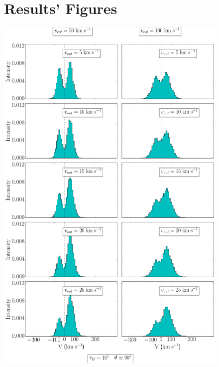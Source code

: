 \documentclass[twocolappendix]{latex/emulateapj}
\begin{document}




\newpage

\appendix

\begin{figure}[!htbp]
	\centering
	\begin{minipage}[b]{0.45\textwidth}
		\section{Results' Figures}
		\label{ap:results_figures}
		
		\includegraphics[width=\textwidth]{./figures/3_tau10E5_phi83-90}

\end{minipage}
\end{figure}
\end{document}
